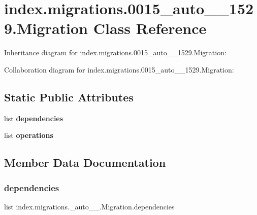 \hypertarget{classindex_1_1migrations_1_10015__auto__20171024__1529_1_1Migration}{}\section{index.\+migrations.0015\+\_\+auto\+\_\+\_\+1529.Migration Class Reference}
\label{classindex_1_1migrations_1_10015__auto__20171024__1529_1_1Migration}


Inheritance diagram for index.\+migrations.0015\+\_\+auto\+\_\+\_\+1529.Migration\+:


Collaboration diagram for index.\+migrations.0015\+\_\+auto\+\_\+\_\+1529.Migration\+:
\subsection*{Static Public Attributes}
\begin{DoxyCompactItemize}
\item 
list {\bfseries dependencies}
\item 
list {\bfseries operations}
\end{DoxyCompactItemize}


\subsection{Member Data Documentation}
\mbox{\label{classindex_1_1migrations_1_10015__auto__20171024__1529_1_1Migration_abefff3bd6ed9f5a4d7162cafcfba0eab}} 
\subsubsection{\texorpdfstring{dependencies}{dependencies}}
{\footnotesize\ttfamily list index.\+migrations.\+\_\+auto\+\_\+\_.\+Migration.\+dependencies\hspace{0.3cm}{\ttfamily [static]}}

